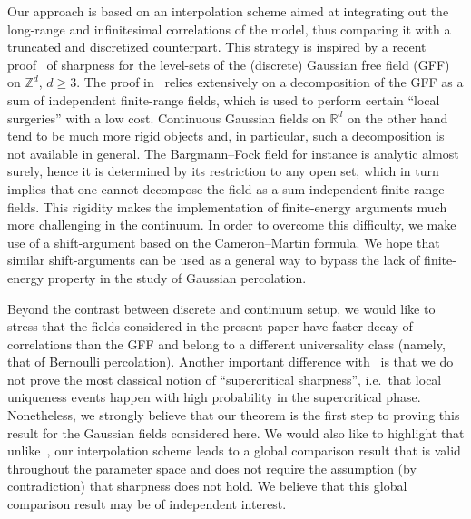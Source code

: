 \documentclass[10pt]{amsart}
\theoremstyle{definition}\newtheorem{defi}[theo]{Definition}\newtheorem{rema}[theo]{Remark}\newtheorem{exam}[theo]{Example}\newtheorem{exem}[theo]{Example}\newtheorem{nota}[theo]{Notation}
\newcommand{\R}{\mathbb{R}}
\newcommand{\Z}{\mathbb{Z}}
\begin{document}
Our approach is based on an interpolation scheme aimed at integrating out the long-range and infinitesimal correlations of the model, thus comparing it with a truncated and discretized counterpart. This strategy is inspired by a recent proof~\cite{DGRS19} of sharpness for the level-sets of the (discrete) Gaussian free field (GFF) on $\Z^d$, $d\geq 3$. The proof in~\cite{DGRS19} relies extensively on a decomposition of the GFF as a sum of independent finite-range fields, which is used to perform certain ``local surgeries'' with a low cost. Continuous Gaussian fields on $\R^d$ on the other hand tend to be much more rigid objects and, in particular, such a decomposition is not available in general. The Bargmann--Fock field for instance is analytic almost surely, hence it is determined by its restriction to any open set, which in turn implies that one cannot decompose the field as a sum independent finite-range fields. This rigidity makes the implementation of finite-energy arguments much more challenging in the continuum. In order to overcome this difficulty, we make use of a shift-argument based on the Cameron--Martin formula. We hope that similar shift-arguments can be used as a general way to bypass the lack of finite-energy property in the study of Gaussian percolation.

Beyond the contrast between discrete and continuum setup, we would like to stress that the fields considered in the present paper have faster decay of correlations than the GFF and belong to a different universality class (namely, that of Bernoulli percolation). Another important difference with~\cite{DGRS19} is that we do not prove the most classical notion of ``supercritical sharpness'', i.e.~that local uniqueness events happen with high probability in the supercritical phase. Nonetheless, we strongly believe that our theorem is the first step to proving this result for the Gaussian fields considered here. We would also like to highlight that unlike~\cite{DGRS19}, our interpolation scheme leads to a global comparison result that is valid throughout the parameter space and does not require the assumption (by contradiction) that sharpness does not hold. We believe that this global comparison result may be of independent interest.
\end{document}
